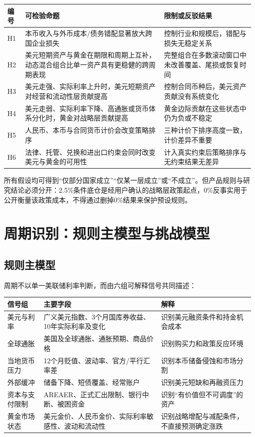 \documentclass[UTF8,fontset=windows,12pt,openany]{ctexbook}
\begin{document}
\begin{longtable}{p{1.0cm}p{7.1cm}p{5.2cm}}
\toprule
\textbf{编号} & \textbf{可检验命题} & \textbf{限制或反驳结果}\\
\midrule
H1 & 本币收入与外币成本/债务错配显著放大跨国企业损失 & 控制行业和规模后，错配与损失无稳定关系\\
H2 & 美元短期资产与黄金在期限和周期上互补，动态混合组合比单一资产具有更稳健的跨周期表现 & 完整组合在多数滚动窗口中未改善覆盖、尾损或恢复时间\\
H3 & 美元走强、实际利率上升时，美元短期资产对经营和流动性层贡献提高 & 控制合同币种后，美元资产贡献没有系统变化\\
H4 & 美元走弱、实际利率下降、高通胀或货币体系分化时，黄金对战略层贡献提高 & 黄金边际贡献在这些状态中仍为负或不稳定\\
H5 & 人民币、本币与合同货币计价会改变策略排序 & 三种计价下排序高度一致，计价差异不重要\\
H6 & 法律、托管、兑换和进出口约束会同时改变美元与黄金的可用性 & 计入真实约束后策略排序与无约束结果无差异\\
\bottomrule
\end{longtable}

所有假设均可得到“仅部分国家成立”“仅某一层成立”或“不成立”。但产品规则与研究结论必须分开：2.5\%条件底仓是经用户确认的战略层政策起点，0\%反事实用于公开衡量该政策成本，不得通过删掉0\%结果来保护预设规则。

\chapter{周期识别：规则主模型与挑战模型}

\section{规则主模型}

周期不以单一美联储利率判断，而由六组可解释信号共同描述：

\begin{longtable}{p{3.1cm}p{5.2cm}p{5.0cm}}
\toprule
\textbf{信号组} & \textbf{主要字段} & \textbf{解释}\\
\midrule
美元与利率 & 广义美元指数、3个月国库券收益、10年实际利率及变化 & 识别美元融资条件和持金机会成本\\
全球通胀 & 美国及全球通胀、通胀预期、商品价格 & 识别购买力和政策反应环境\\
当地货币压力 & 12个月贬值、波动率、官方/平行汇率差 & 识别本币储备侵蚀和市场分割\\
外部缓冲 & 储备下降、短债覆盖、经常账户 & 识别美元短缺和再融资压力\\
资本与支付限制 & AREAER、正式汇出限制、银行中断、被困资金 & 识别“有价值但不可调度”的资产\\
黄金市场状态 & 美元金价、人民币金价、实际利率敏感性、波动和流动性 & 识别战略增配与减配条件，不直接预测确定涨跌\\
\bottomrule
\end{longtable}
\end{document}
